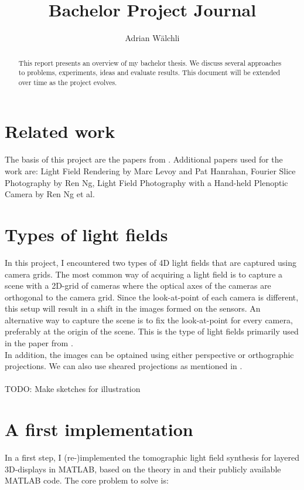 \documentclass[11pt,a4paper,titlepage]{article}
\author{Adrian Wälchli}
\title{Bachelor Project Journal}
\begin{document}
\maketitle
\begin{abstract}
This report presents an overview of my bachelor thesis. We discuss several approaches to problems, experiments, ideas and evaluate results. This document will be extended over time as the project evolves.
\end{abstract}

\tableofcontents
\newpage

\section{Related work}
The basis of this project are the papers from \cite{WETZ_TOMO, WETZ_TENS}. Additional papers used for the work are: Light Field Rendering by Marc Levoy and Pat Hanrahan, Fourier Slice Photography by Ren Ng, Light Field Photography with a Hand-held Plenoptic Camera by Ren Ng et al. 

\section{Types of light fields} \label{sec:lftypes}
In this project, I encountered two types of 4D light fields that are captured using camera grids. The most common way of acquiring a light field is to capture a scene with a 2D-grid of cameras where the optical axes of the cameras are orthogonal to the camera grid. Since the look-at-point of each camera is different, this setup will result in a shift in the images formed on the sensors. An alternative way to capture the scene is to fix the look-at-point for every camera, preferably at the origin of the  scene. This is the type of light fields primarily used in the paper from \cite{WETZ_TOMO}. 
\\
In addition, the images can be optained using either perspective or orthographic projections. We can also use sheared projections as mentioned in \cite[p.~4]{LEVO_LFREN}.
\\\\
TODO: Make sketches for illustration


\section{A first implementation}
In a first step, I (re-)implemented the tomographic light field synthesis for layered 3D-displays in MATLAB, based on the theory in \cite{WETZ_TOMO} and their publicly available MATLAB code. The core problem to solve is:
\end{document}
